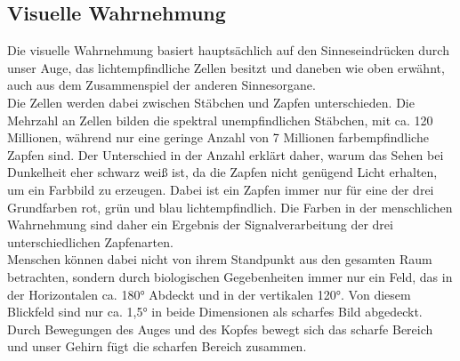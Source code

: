 \subsection{Visuelle Wahrnehmung}
Die visuelle Wahrnehmung basiert hauptsächlich auf den Sinneseindrücken durch unser Auge, das lichtempfindliche Zellen besitzt und daneben wie oben erwähnt, auch aus dem Zusammenspiel der anderen Sinnesorgane.\\
Die Zellen werden dabei zwischen Stäbchen und Zapfen unterschieden. Die Mehrzahl an Zellen bilden die spektral unempfindlichen Stäbchen, mit ca. 120 Millionen, während nur eine geringe Anzahl von 7 Millionen farbempfindliche Zapfen sind. Der Unterschied in der Anzahl erklärt daher, warum das Sehen bei Dunkelheit eher schwarz weiß ist, da die Zapfen nicht genügend Licht erhalten, um ein Farbbild zu erzeugen. Dabei ist ein Zapfen immer nur für eine der drei Grundfarben rot, grün und blau lichtempfindlich. Die Farben in der menschlichen Wahrnehmung sind daher ein Ergebnis der Signalverarbeitung der drei unterschiedlichen Zapfenarten. \cite[Vgl. Seite 14]{Buhler.2017}\\
Menschen können dabei nicht von ihrem Standpunkt aus den gesamten Raum betrachten, sondern durch biologischen Gegebenheiten immer nur ein Feld, das in der Horizontalen ca. 180° Abdeckt und in der vertikalen 120°. Von diesem Blickfeld sind nur ca. 1,5° in beide Dimensionen als scharfes Bild abgedeckt. Durch Bewegungen des Auges und des Kopfes bewegt sich das scharfe Bereich und unser Gehirn fügt die scharfen Bereich zusammen. \cite[Vgl. Seite 14]{Buhler.2017}
